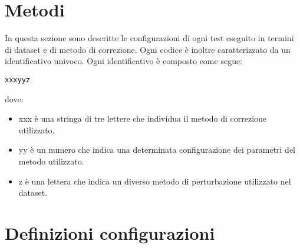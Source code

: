 \documentclass[12pt]{article}
\begin{document}
\maketitle




\section{Metodi}
In questa sezione sono descritte le configurazioni di ogni test eseguito in termini di dataset e di metodo di correzione. Ogni codice è inoltre caratterizzato da un identificativo univoco. Ogni identificativo è composto come segue:
\begin{center}
	\texttt{xxxyyz}
\end{center}
dove:
\begin{itemize}
	\item xxx è una stringa di tre lettere che individua il metodo di correzione utilizzato.
	\item yy è un numero che indica una determinata configurazione dei parametri del metodo utilizzato.
	\item z è una lettera che indica un diverso metodo di perturbazione utilizzato nel dataset.
\end{itemize}

\section{Definizioni configurazioni}
\end{document}
